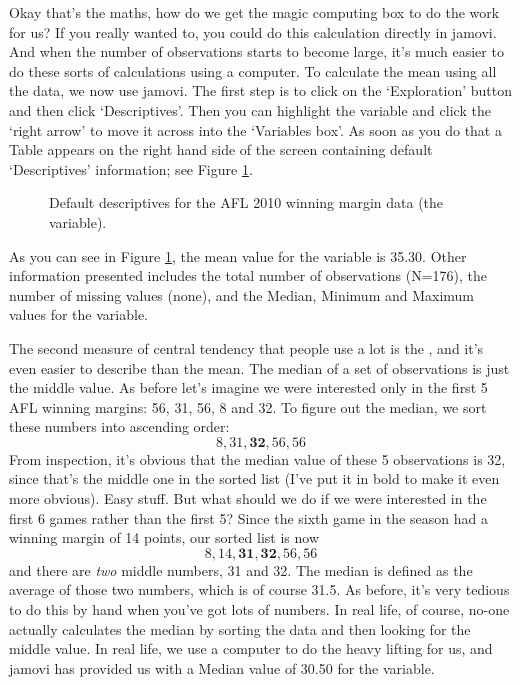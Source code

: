 
Okay that's the maths, how do we get the magic computing box to do the work for us? If you really wanted to, you could do this calculation directly in jamovi. And when the number of observations starts to become large, it's much easier to do these sorts of calculations using a computer. To calculate the mean using all the data, we now use jamovi. The first step is to click on the `Exploration' button and then click `Descriptives'. Then you can highlight the  variable and click the `right arrow' to move it across into the `Variables box'. As soon as you do that a Table appears on the right hand side of the screen containing default `Descriptives' information; see Figure \ref{fig:descriptives_default}. 

\vspace*{1cm}
\begin{figure}[ht]
\begin{center}
\caption{Default descriptives for the AFL 2010 winning margin data (the  variable). }
\label{fig:descriptives_default}
\HR
\end{center}
\end{figure}

As you can see in Figure \ref{fig:descriptives_default}, the mean value for the  variable is 35.30. Other information presented includes the total number of observations (N=176), the number of missing values (none), and the Median, Minimum and Maximum values for the variable. 


The second measure of central tendency that people use a lot is the , and it's even easier to describe than the mean. The median of a set of observations is just the middle value. As before let's imagine we were interested only in the first 5 AFL winning margins: 56, 31, 56, 8 and 32. To figure out the median, we sort these numbers into ascending order:
$$
8, 31, \mathbf{32}, 56, 56
$$
From inspection, it's obvious that the median value of these 5 observations is 32, since that's the middle one in the sorted list (I've put it in bold to make it even more obvious). Easy stuff. But what should we do if we were interested in the first 6 games rather than the first 5? Since the sixth game in the season had a winning margin of 14 points, our sorted list is now 
$$
8, 14, \mathbf{31}, \mathbf{32}, 56, 56
$$
and there are {\it two} middle numbers, 31 and 32. The median is defined as the average of those two numbers, which is of course 31.5. As before, it's very tedious to do this by hand when you've got lots of numbers. In real life, of course, no-one actually calculates the median by sorting the data and then looking for the middle value. In real life, we use a computer to do the heavy lifting for us, and jamovi has provided us with a Median value of 30.50 for the  variable. 


